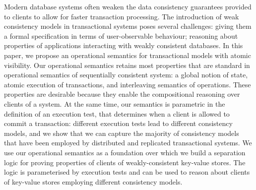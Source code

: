 Modern database systems often weaken the data consistency guarantees 
provided to clients to allow for faster transaction processing. 
The introduction of weak consistency models in transactional systems 
poses several challenges: giving them a formal specification in terms 
of user-observable behaviour; reasoning about properties of applications 
interacting with weakly consistent databases.
In this paper, we propose an operational semantics for transactional models with  
atomic visibility. Our operational semantics retains most properties 
that are standard in operational semantics of sequentially consistent system: 
a global notion of state, atomic execution of transactions, and interleaving 
semantics of operations. These properties are desirable because they enable 
the compositional reasoning over clients of a system.
At the same time, our semantics is parametric
in the definition of an execution test, that determines 
when a client is allowed to commit a transaction: different execution tests lead 
to different consistency models, and we show that we can capture the majority 
of consistency models that have been employed by distributed and replicated 
transactional systems. 
We use our operational semantics as a foundation over which we build a separation 
logic for proving properties of clients of weakly-consistent key-value stores.
The logic is parameterised by execution tests and can be used 
to reason about clients of key-value stores employing different consistency models.
